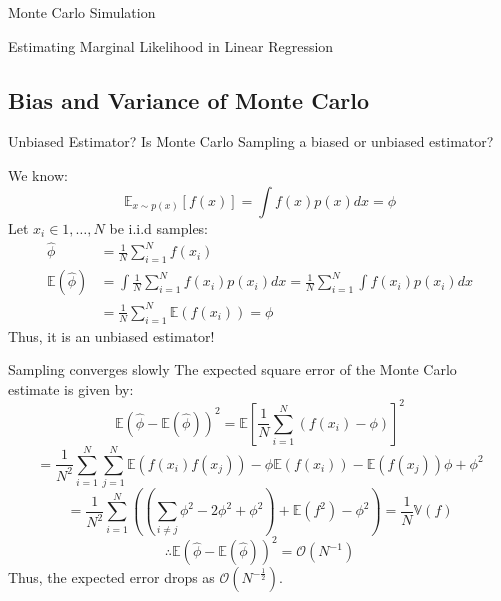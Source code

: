 \documentclass{beamer}
\begin{document}
\begin{section}{Monte Carlo Simulation}
\begin{frame}{Estimating Marginal Likelihood in Linear Regression}
        \end{frame}
        

 


    \subsection{Bias and Variance of Monte Carlo}
    \begin{frame}{Unbiased Estimator?}
        Is Monte Carlo Sampling a biased or unbiased estimator?

        We know:
        \begin{equation}
            \mathbb{E}_{x \sim p(x)}[f(x)] = \int f(x) p(x) dx = \phi
        \end{equation}
        Let $x_i\in 1, \ldots, N$ be i.i.d samples:
        \begin{align*}
            \hat{\phi} &= \frac{1}{N} \sum_{i=1}^{N} f(x_i) \\
            \mathbb{E}(\hat{\phi}) &= \int \frac{1}{N} \sum_{i=1}^{N} f(x_i)p(x_i)dx = \frac{1}{N}\sum_{i=1}^{N} \int f(x_i)p(x_i)dx \\
            &= \frac{1}{N}\sum_{i=1}^N\mathbb{E}(f(x_i)) = \phi
        \end{align*}
        Thus, it is an unbiased estimator!
    \end{frame}

    \begin{frame}{Sampling converges slowly}
        The expected square error of the Monte Carlo estimate is given by:
        $$
        \mathbb{E} \left( \hat{\phi} - \mathbb{E} (\hat{\phi}) \right)^2 = \mathbb{E} \left[ \frac{1}{N} \sum_{i=1}^{N} (f(x_i) - \phi) \right]^2 
        $$
        $$
        = \frac{1}{N^2} \sum_{i=1}^{N} \sum_{j=1}^{N} \mathbb{E} (f(x_i) f(x_j)) - \phi \mathbb{E} (f(x_i)) - \mathbb{E} (f(x_j)) \phi + \phi^2
        $$
        $$
        = \frac{1}{N^2} \sum_{i=1}^{N} \left( \left( \sum_{i \neq j}^{} \phi^2 - 2 \phi^2 + \phi^2 \right) + \mathbb{E} (f^2) - \phi^2 \right) = \frac{1}{N} \mathbb{V} (f)
        $$
        $$
        \therefore \mathbb{E} \left( \hat{\phi} - \mathbb{E} (\hat{\phi}) \right)^2 = \mathcal{O} (N^{-1})
        $$
        Thus, the expected error drops as $\mathcal{O} (N^{-\frac{1}{2}})$.
    \end{frame}

\end{section}
\end{document}
